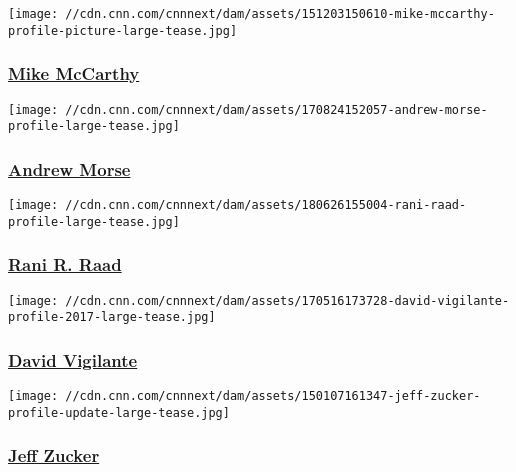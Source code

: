 \href{/profiles/mike-mccarthy-profile}{}

\texttt{[image: //cdn.cnn.com/cnnnext/dam/assets/151203150610-mike-mccarthy-profile-picture-large-tease.jpg]}

\hypertarget{mike-mccarthy}{%
\subsubsection{\texorpdfstring{\href{/profiles/mike-mccarthy-profile}{Mike
McCarthy}}{Mike McCarthy}}\label{mike-mccarthy}}

\href{/profiles/andrew-morse-profile}{}

\texttt{[image: //cdn.cnn.com/cnnnext/dam/assets/170824152057-andrew-morse-profile-large-tease.jpg]}

\hypertarget{andrew-morse}{%
\subsubsection{\texorpdfstring{\href{/profiles/andrew-morse-profile}{Andrew
Morse}}{Andrew Morse}}\label{andrew-morse}}

\href{/profiles/rani-r-raad-profile}{}

\texttt{[image: //cdn.cnn.com/cnnnext/dam/assets/180626155004-rani-raad-profile-large-tease.jpg]}

\hypertarget{rani-r-raad}{%
\subsubsection{\texorpdfstring{\href{/profiles/rani-r-raad-profile}{Rani
R. Raad}}{Rani R. Raad}}\label{rani-r-raad}}

\href{/profiles/david-vigilante-profile}{}

\texttt{[image: //cdn.cnn.com/cnnnext/dam/assets/170516173728-david-vigilante-profile-2017-large-tease.jpg]}

\hypertarget{david-vigilante}{%
\subsubsection{\texorpdfstring{\href{/profiles/david-vigilante-profile}{David
Vigilante}}{David Vigilante}}\label{david-vigilante}}

\href{/profiles/jeff-zucker-profile}{}

\texttt{[image: //cdn.cnn.com/cnnnext/dam/assets/150107161347-jeff-zucker-profile-update-large-tease.jpg]}

\hypertarget{jeff-zucker}{%
\subsubsection{\texorpdfstring{\href{/profiles/jeff-zucker-profile}{Jeff
Zucker}}{Jeff Zucker}}\label{jeff-zucker}}

